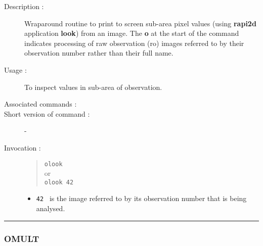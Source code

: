 \begin{description}

\item[Description :] Wraparound routine to print to screen sub-area
pixel values (using {\bf rapi2d} application {\bf look}) from an image. The
{\bf o} at the start of the command indicates processing of raw observation
({\sc ro}) images referred to by their observation number rather than
their full name.

\item[Usage :] To inspect values in sub-area of observation.
\item[Associated commands :] {\tt {}}
\item[Short version of command :] -
\item[Invocation :]

\begin{quote}{\tt  olook }\\
or \\
{\tt olook 42 }
\end{quote}

\begin{itemize}

\item {\tt 42 } is the image referred to by its observation number that
  is being analysed.
\end{itemize}

\end{description}

\hrule
\subsubsection*{\label{OMULT}OMULT}

